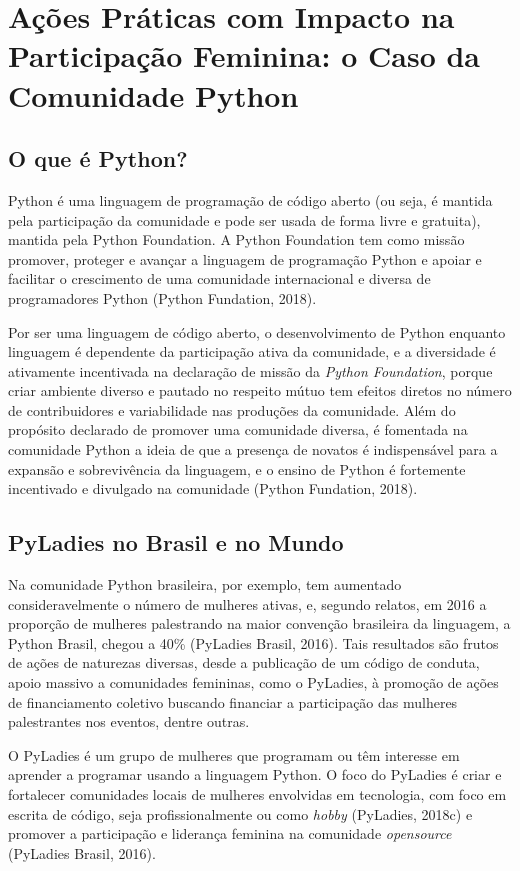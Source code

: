 \section{Ações Práticas com Impacto na Participação Feminina: o Caso da Comunidade Python}
\subsection{O que é Python?}

Python é uma linguagem de programação de código aberto (ou seja, é mantida pela participação da comunidade e pode ser usada de forma livre e gratuita), mantida pela Python Foundation. A Python Foundation tem como missão promover, proteger e avançar a linguagem de programação Python e apoiar e facilitar o crescimento de uma comunidade internacional e diversa de programadores Python (Python Fundation, 2018).

Por ser uma linguagem de código aberto, o desenvolvimento de Python enquanto linguagem é dependente da participação ativa da comunidade, e a diversidade é ativamente incentivada na declaração de missão da \textit{Python Foundation}, porque criar ambiente diverso e pautado no respeito mútuo tem efeitos diretos no número de contribuidores e variabilidade nas produções da comunidade. Além do propósito declarado de promover uma comunidade diversa, é fomentada na comunidade Python a ideia de que a presença de novatos é indispensável para a expansão e sobrevivência da linguagem, e o ensino de Python é fortemente incentivado e divulgado na comunidade (Python Fundation, 2018).

\subsection{PyLadies no Brasil e no Mundo}

Na comunidade Python brasileira, por exemplo, tem aumentado consideravelmente o número de mulheres ativas, e, segundo relatos, em 2016 a proporção de mulheres palestrando na maior convenção brasileira da linguagem, a Python Brasil, chegou a 40\% (PyLadies Brasil, 2016). Tais resultados são frutos de ações de naturezas diversas, desde a publicação de um código de conduta, apoio massivo a comunidades femininas, como o PyLadies, à promoção de ações de financiamento coletivo buscando financiar a participação das mulheres palestrantes nos eventos, dentre outras.

O PyLadies é um grupo de mulheres que programam ou têm interesse em aprender a programar usando a linguagem Python. O foco do PyLadies é criar e fortalecer comunidades locais de mulheres envolvidas em tecnologia, com foco em escrita de código, seja profissionalmente ou como \textit{hobby} (PyLadies, 2018c) e promover a participação e liderança feminina na comunidade \textit{opensource} (PyLadies Brasil, 2016).

